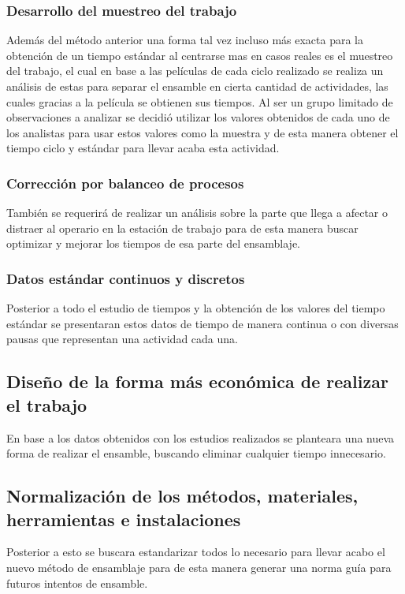 \subsubsection{Desarrollo del muestreo del trabajo}
Además del método anterior una forma tal vez incluso más exacta para la obtención de un tiempo estándar al centrarse mas en casos reales es el muestreo del trabajo, el cual en base a las películas de cada ciclo realizado se realiza un análisis de estas para separar el ensamble en cierta cantidad de actividades, las cuales gracias a la película se obtienen sus tiempos. Al ser un grupo limitado de observaciones a analizar se decidió utilizar los valores obtenidos de cada uno de los analistas para usar estos valores como la muestra y de esta manera obtener el tiempo ciclo y estándar para llevar acaba esta actividad.

\subsubsection{Corrección por balanceo de procesos}
También se requerirá de realizar un análisis sobre la parte que llega a afectar o distraer al operario en la estación de trabajo para de esta manera buscar optimizar y mejorar los tiempos de esa parte del ensamblaje.

\subsubsection{Datos estándar continuos y discretos}
Posterior a todo el estudio de tiempos y la obtención de los valores del tiempo estándar se presentaran estos datos de tiempo de manera continua o con diversas pausas que representan una actividad cada una.

\subsection{Diseño de la forma más económica de realizar el trabajo}
     En base a los datos obtenidos con los estudios realizados se planteara una nueva forma de realizar el ensamble, buscando eliminar cualquier tiempo innecesario.
        
\subsection{Normalización de los métodos, materiales, herramientas e instalaciones}
Posterior a esto se buscara estandarizar todos lo necesario para llevar acabo el nuevo método de ensamblaje para de esta manera generar una norma guía para futuros intentos de ensamble.

